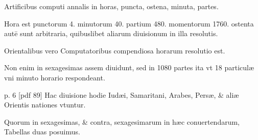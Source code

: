 \begin{parnumbers}
Artificibus
computi annalis in
horas, puncta, ostena, minuta,
partes.

Hora est punctorum
4. minutorum 40.
partium 480. momentorum
1760. ostenta autē sunt arbitraria,
quibuslibet aliarum
diuisionum in illa resolutis.

Orientalibus vero Computatoribus
compendiosa horarum
resolutio est.

Non
enim in sexagesimas assem
diuidunt, sed in 1080 partes
ita vt 18 particulæ vni minuto
horario respondeant.

\clearpage
p. 6 [pdf 89]
Hac diuisione hodie Iudæi,
Samaritani, Arabes, Persæ,
\& aliæ Orientis nationes vtuntur.

Quorum in sexagesimas, \&
contra, sexagesimarum in hæc conuertendarum, Tabellas duas posuimus.

\end{parnumbers}

